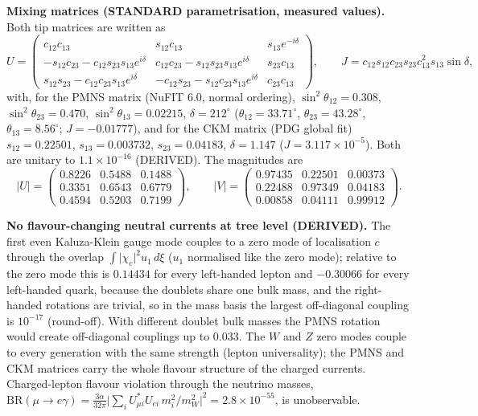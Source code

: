 \documentclass[
  10pt,
]{article}
\begin{document}
\textbf{Mixing matrices (STANDARD parametrisation, measured values).}
Both tip matrices are written as
\[ U = \begin{pmatrix} c_{12}c_{13} & s_{12}c_{13} & s_{13}e^{-i\delta}\\ -s_{12}c_{23} - c_{12}s_{23}s_{13}e^{i\delta} & c_{12}c_{23} - s_{12}s_{23}s_{13}e^{i\delta} & s_{23}c_{13}\\
   s_{12}s_{23} - c_{12}c_{23}s_{13}e^{i\delta} & -c_{12}s_{23} - s_{12}c_{23}s_{13}e^{i\delta} & c_{23}c_{13}\end{pmatrix},\qquad
   J = c_{12}s_{12}c_{23}s_{23}c_{13}^2s_{13}\sin\delta, \] with, for
the PMNS matrix (NuFIT 6.0, normal ordering),
\(\sin^2\theta_{12} = 0.308\), \(\sin^2\theta_{23} = 0.470\),
\(\sin^2\theta_{13} = 0.02215\), \(\delta = 212^\circ\)
(\(\theta_{12} = 33.71^\circ\), \(\theta_{23} = 43.28^\circ\),
\(\theta_{13} = 8.56^\circ\); \(J = -0.01777\)), and for the CKM matrix
(PDG global fit) \(s_{12} = 0.22501\), \(s_{13} = 0.003732\),
\(s_{23} = 0.04183\), \(\delta = 1.147\) (\(J = 3.117\times10^{-5}\)).
Both are unitary to \(1.1\times10^{-16}\) (DERIVED). The magnitudes are
\[ \lvert U\rvert = \begin{pmatrix} 0.8226 & 0.5488 & 0.1488\\ 0.3351 & 0.6543 & 0.6779\\ 0.4594 & 0.5203 & 0.7199\end{pmatrix},\qquad
   \lvert V\rvert = \begin{pmatrix} 0.97435 & 0.22501 & 0.00373\\ 0.22488 & 0.97349 & 0.04183\\ 0.00858 & 0.04111 & 0.99912\end{pmatrix}. \]

\textbf{No flavour-changing neutral currents at tree level (DERIVED).}
The first even Kaluza-Klein gauge mode couples to a zero mode of
localisation \(c\) through the overlap
\(\int\lvert\chi_c\rvert^2u_1\,d\xi\) (\(u_1\) normalised like the zero
mode); relative to the zero mode this is \(0.14434\) for every
left-handed lepton and \(-0.30066\) for every left-handed quark, because
the doublets share one bulk mass, and the right-handed rotations are
trivial, so in the mass basis the largest off-diagonal coupling is
\(10^{-17}\) (round-off). With different doublet bulk masses the PMNS
rotation would create off-diagonal couplings up to \(0.033\). The \(W\)
and \(Z\) zero modes couple to every generation with the same strength
(lepton universality); the PMNS and CKM matrices carry the whole flavour
structure of the charged currents. Charged-lepton flavour violation
through the neutrino masses,
\(\mathrm{BR}(\mu\to e\gamma) = \frac{3\alpha}{32\pi}\big\lvert\sum_iU^*_{\mu i}U_{ei}\,m_i^2/m_W^2\big\rvert^2 = 2.8\times10^{-55}\),
is unobservable.
\end{document}
